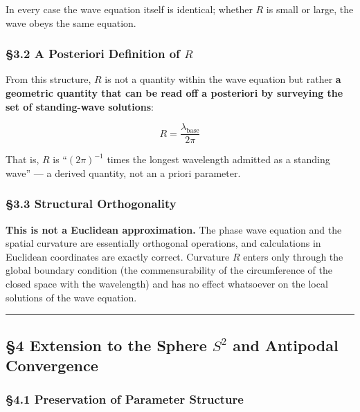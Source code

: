 \documentclass[
  a4paper,11pt]{article}
\theoremstyle{definition}
\theoremstyle{remark}
\begin{document}
In every case the wave equation itself is identical; whether \(R\) is
small or large, the wave obeys the same equation.

\subsubsection{\texorpdfstring{§3.2 A Posteriori Definition of
\(R\)}{§3.2 A Posteriori Definition of R}}\label{a-posteriori-definition-of-r}

From this structure, \(R\) is not a quantity within the wave equation
but rather \textbf{a geometric quantity that can be read off a
posteriori by surveying the set of standing-wave solutions}:

\[R = \frac{\lambda_{\text{base}}}{2\pi}\]

That is, \(R\) is ``\((2\pi)^{-1}\) times the longest wavelength
admitted as a standing wave'' --- a derived quantity, not an a priori
parameter.

\subsubsection{§3.3 Structural
Orthogonality}\label{structural-orthogonality}

\textbf{This is not a Euclidean approximation.} The phase wave equation
and the spatial curvature are essentially orthogonal operations, and
calculations in Euclidean coordinates are exactly correct. Curvature
\(R\) enters only through the global boundary condition (the
commensurability of the circumference of the closed space with the
wavelength) and has no effect whatsoever on the local solutions of the
wave equation.

\begin{center}\rule{0.5\linewidth}{0.5pt}\end{center}

\subsection{\texorpdfstring{§4 Extension to the Sphere \(S^2\) and
Antipodal
Convergence}{§4 Extension to the Sphere S\^{}2 and Antipodal Convergence}}\label{extension-to-the-sphere-s2-and-antipodal-convergence}

\subsubsection{§4.1 Preservation of Parameter
Structure}\label{preservation-of-parameter-structure}
\end{document}
